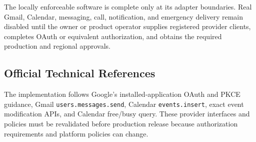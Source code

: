 The locally enforceable software is complete only at its adapter boundaries.
Real Gmail, Calendar, messaging, call, notification, and emergency delivery remain
disabled until the owner or product operator supplies registered provider clients,
completes OAuth or equivalent authorization, and obtains the required production
and regional approvals.

\subsection{Official Technical References}

The implementation follows Google's installed-application OAuth and PKCE guidance,
Gmail \texttt{users.messages.send}, Calendar \texttt{events.insert}, exact event
modification APIs, and Calendar free/busy query.  These provider interfaces and
policies must be revalidated before production release because authorization
requirements and platform policies can change.
